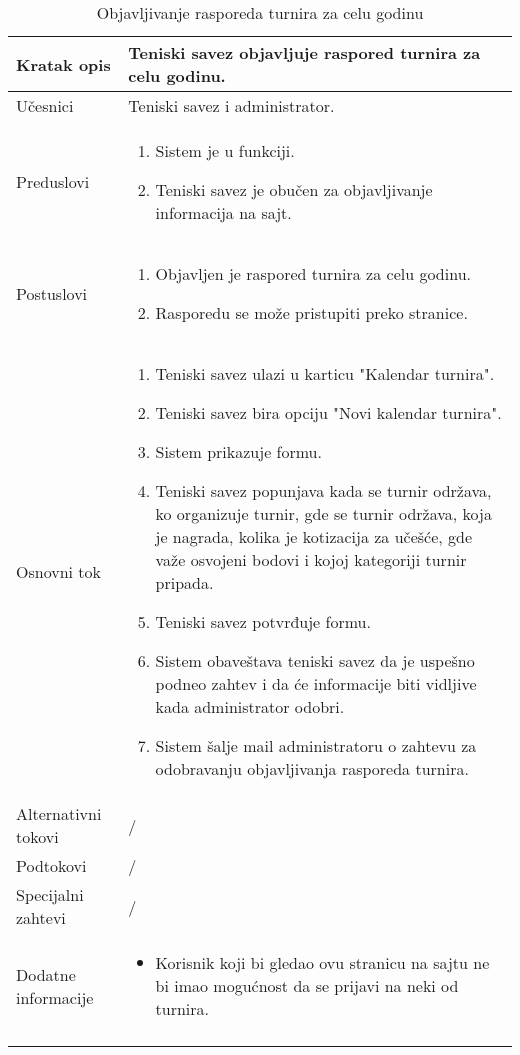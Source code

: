 \documentclass{article}
\begin{document}
    \begin{longtable}{| p{} | p{} |} 
        \hline
            Kratak opis & Teniski savez objavljuje raspored turnira za celu godinu.\\ 
        \hline    
            Učesnici & Teniski savez i administrator.\\
        \hline
            Preduslovi & 
                \begin{enumerate}
                    \item Sistem je u funkciji.
                    \item Teniski savez je obučen za objavljivanje informacija na sajt.
                \end{enumerate}\\
        \hline  
            Postuslovi & 
                \begin{enumerate}
                    \item Objavljen je raspored turnira za celu godinu.
                    \item Rasporedu se može pristupiti preko stranice.
                \end{enumerate}\\
        \hline
            Osnovni tok & 
                \begin{enumerate}
                    \item Teniski savez ulazi u karticu "Kalendar turnira".
                    \item Teniski savez bira opciju "Novi kalendar turnira".
                    \item Sistem prikazuje formu.
                    \item Teniski savez popunjava kada se turnir održava, ko organizuje turnir, gde se turnir održava, koja je nagrada, kolika je kotizacija za učešće, gde važe osvojeni bodovi i kojoj kategoriji turnir pripada. 
                    \item Teniski savez potvrđuje formu.
                    \item Sistem obaveštava teniski savez da je uspešno podneo zahtev i da će informacije biti vidljive kada administrator odobri.
                    \item Sistem šalje mail administratoru o zahtevu za odobravanju objavljivanja rasporeda turnira.
                \end{enumerate}\\
        \hline
            Alternativni tokovi & /\\
        \hline
            Podtokovi & /\\
        \hline
            Specijalni zahtevi & /\\
        \hline
            Dodatne informacije & 
                \begin{itemize}
                    \item Korisnik koji bi gledao ovu stranicu na sajtu ne bi imao mogućnost da se prijavi na neki od turnira.
                \end{itemize}\\
        \hline 
        \caption{Objavljivanje rasporeda turnira za celu godinu}
    \end{longtable}
\end{document}
